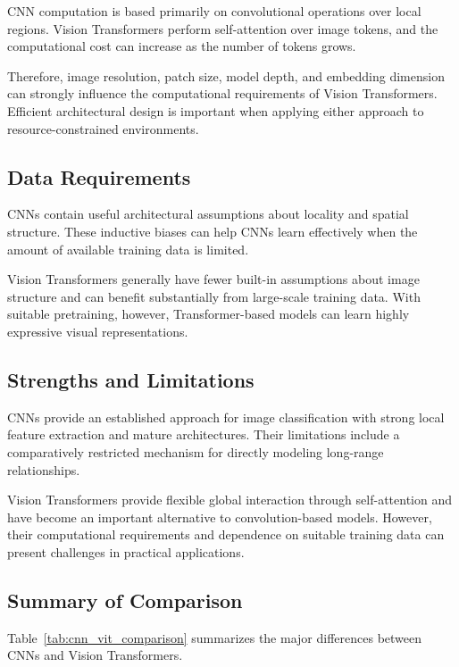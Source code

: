 \documentclass[conference]{IEEEtran}
\begin{document}
CNN computation is based primarily on convolutional operations over local regions. Vision Transformers perform self-attention over image tokens, and the computational cost can increase as the number of tokens grows.

Therefore, image resolution, patch size, model depth, and embedding dimension can strongly influence the computational requirements of Vision Transformers. Efficient architectural design is important when applying either approach to resource-constrained environments.

\subsection{Data Requirements}

CNNs contain useful architectural assumptions about locality and spatial structure. These inductive biases can help CNNs learn effectively when the amount of available training data is limited.

Vision Transformers generally have fewer built-in assumptions about image structure and can benefit substantially from large-scale training data. With suitable pretraining, however, Transformer-based models can learn highly expressive visual representations.

\subsection{Strengths and Limitations}

CNNs provide an established approach for image classification with strong local feature extraction and mature architectures. Their limitations include a comparatively restricted mechanism for directly modeling long-range relationships.

Vision Transformers provide flexible global interaction through self-attention and have become an important alternative to convolution-based models. However, their computational requirements and dependence on suitable training data can present challenges in practical applications.

\subsection{Summary of Comparison}

Table~\ref{tab:cnn_vit_comparison} summarizes the major differences between CNNs and Vision Transformers.
\end{document}
